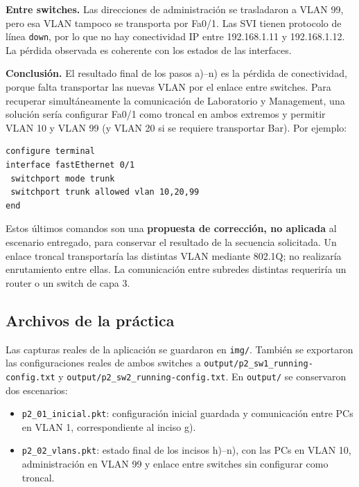 \documentclass[12pt,a4paper]{article}
\begin{document}
\textbf{Entre switches.} Las direcciones de administración se trasladaron
a VLAN 99, pero esa VLAN tampoco se transporta por Fa0/1. Las SVI tienen
protocolo de línea \texttt{down}, por lo que no hay conectividad IP entre
192.168.1.11 y 192.168.1.12. La pérdida observada es coherente con los
estados de las interfaces.



\textbf{Conclusión.} El resultado final de los pasos a)--n) es la pérdida
de conectividad, porque falta transportar las nuevas VLAN por el enlace
entre switches. Para recuperar simultáneamente la comunicación de
Laboratorio y Management, una solución sería configurar Fa0/1 como
troncal en ambos extremos y permitir VLAN 10 y VLAN 99 (y VLAN 20 si se
requiere transportar Bar). Por ejemplo:
\begin{verbatim}
configure terminal
interface fastEthernet 0/1
 switchport mode trunk
 switchport trunk allowed vlan 10,20,99
end
\end{verbatim}
Estos últimos comandos son una \textbf{propuesta de corrección, no aplicada}
al escenario entregado, para conservar el resultado de la secuencia
solicitada. Un enlace troncal transportaría las distintas VLAN mediante
802.1Q; no realizaría enrutamiento entre ellas. La comunicación entre
subredes distintas requeriría un router o un switch de capa 3.

\subsection{Archivos de la práctica}
Las capturas reales de la aplicación se guardaron en \texttt{img/}.
También se exportaron las configuraciones reales de ambos switches a
\texttt{output/p2\_sw1\_running-config.txt} y
\texttt{output/p2\_sw2\_running-config.txt}.
En \texttt{output/} se conservaron dos escenarios:
\begin{itemize}
\item \texttt{p2\_01\_inicial.pkt}: configuración inicial guardada y
comunicación entre PCs en VLAN 1, correspondiente al inciso g).
\item \texttt{p2\_02\_vlans.pkt}: estado final de los incisos h)--n), con
las PCs en VLAN 10, administración en VLAN 99 y enlace entre switches
sin configurar como troncal.
\end{itemize}
\end{document}
